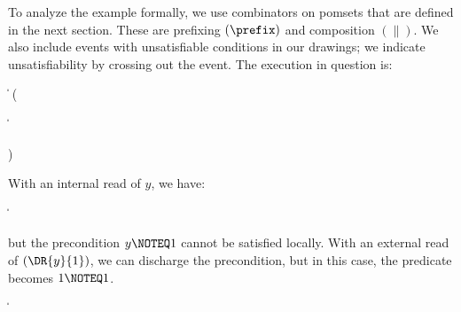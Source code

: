To analyze the example formally, we use combinators on pomsets that are
defined in the next section.  These are prefixing $(\prefix)$ and composition
$(\parallel)$.  We also include events with unsatisfiable conditions in our
drawings; we indicate unsatisfiability by crossing out the event.  The
execution in question is:
\begin{displaymathsmall}
  \begin{tikzcenter}[node distance=1em]
  \end{tikzcenter}
  \Biggm\|
  \prefix
  \left(
    \begin{tikzcenter}[node distance=1em]
    \end{tikzcenter}
    \biggm\|
    \begin{tikzcenter}[node distance=1em]
    \end{tikzcenter}
  \right)
\end{displaymathsmall}
With an internal read of $y$, we have:
\begin{displaymathsmall}
  \begin{tikzcenter}[node distance=1em]
  \end{tikzcenter}
  \Biggm\|
    \begin{tikzcenter}[node distance=1em]
    \end{tikzcenter}
\end{displaymathsmall}
but the precondition $y\NOTEQ1$ cannot be satisfied locally.
With an external read of $(\DR{y}{1})$, we can discharge the precondition, but in this
case, the predicate becomes $1\NOTEQ 1$. 
\begin{displaymathsmall}
  \begin{tikzcenter}[node distance=1em]
  \end{tikzcenter}
  \Bigm\|  
    \begin{tikzcenter}[node distance=1em]
    \end{tikzcenter}
\end{displaymathsmall}

